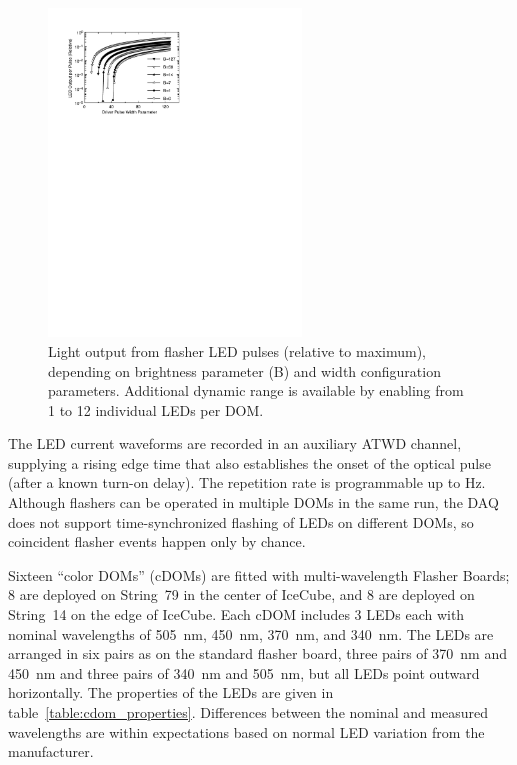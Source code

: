 \begin{figure}[h]
 \centering
 \includegraphics[width=0.6\textwidth]{graphics/dom/functional/domfig5-BrightnessModel.pdf}
 \caption{Light output from flasher LED pulses (relative to maximum), depending
on brightness parameter (B) and width configuration parameters.  Additional dynamic range is available
by enabling from 1 to 12 individual LEDs per DOM.}
 \label{fig:flasheroutput}
\end{figure}

The LED current waveforms are recorded in an auxiliary ATWD channel, supplying
a rising edge time that also establishes the onset of the optical pulse (after a known
turn-on delay).
The repetition rate is programmable up to \unit[610]{Hz}.
Although flashers can be
operated in multiple DOMs in the same run, the DAQ does not support
time-synchronized flashing of LEDs on different DOMs, so coincident flasher
events happen only by chance. 

Sixteen ``color DOMs'' (cDOMs) are fitted with multi-wavelength
Flasher Boards; 8 are deployed on String~79 in the center of IceCube, and 8
are deployed on String~14 on the edge of IceCube.  Each cDOM includes
3 LEDs each with nominal
wavelengths of 505~nm, 450~nm, 370~nm, and 340~nm. The LEDs are
arranged in six pairs as on the
standard flasher board, three pairs of 370~nm and 450~nm and three
pairs of 340~nm and 505~nm, but all LEDs point outward horizontally. 
The properties of the LEDs are given in
table~\ref{table:cdom_properties}. Differences between the nominal and
measured wavelengths are within expectations based on normal LED
variation from the manufacturer.

